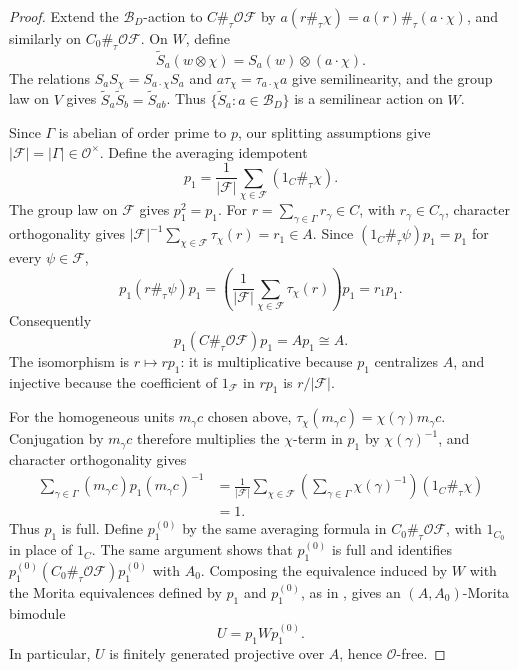 \documentclass[11pt,a4paper]{article}
\theoremstyle{definition}
\theoremstyle{remark}
\numberwithin{equation}{section}
\newcommand{\cO}{\mathcal{O}}
\begin{document}
\begin{proof}
		Extend the $\mathcal B_D$-action to $C\#_\tau\cO\mathcal F$ by
		$a(r\#_\tau\chi)=a(r)\#_\tau(a\cdot\chi)$, and similarly on
		$C_0\#_\tau\cO\mathcal F$. On $W$, define
		\[
		\widetilde S_a(w\otimes\chi)=S_a(w)\otimes(a\cdot\chi).
		\]
		The relations $S_aS_\chi=S_{a\cdot\chi}S_a$ and
		$a\tau_\chi=\tau_{a\cdot\chi}a$ give semilinearity, and the group
		law on $V$ gives
		$\widetilde S_a\widetilde S_b=\widetilde S_{ab}$.
		Thus $\{\widetilde S_a:a\in\mathcal B_D\}$ is a semilinear
		action on $W$.
		
		Since $\Gamma$ is abelian of order prime to $p$, our splitting
		assumptions give $|\mathcal F|=|\Gamma|\in\cO^\times$.
		Define the averaging idempotent
		\[
		p_1=\frac1{|\mathcal F|}\sum_{\chi\in\mathcal F}
		(1_C\#_\tau\chi).
		\]
		The group law on $\mathcal F$ gives $p_1^2=p_1$.
		For $r=\sum_{\gamma\in\Gamma}r_\gamma\in C$, with
		$r_\gamma\in C_\gamma$, character orthogonality gives
		$|\mathcal F|^{-1}\sum_{\chi\in\mathcal F}\tau_\chi(r)=r_1\in A$.
		Since $(1_C\#_\tau\psi)p_1=p_1$ for every $\psi\in\mathcal F$,
		\[
		p_1(r\#_\tau\psi)p_1
		=\left(\frac1{|\mathcal F|}
		\sum_{\chi\in\mathcal F}\tau_\chi(r)\right)p_1=r_1p_1.
		\]
		Consequently
		\begin{equation}\label{eq:local-full-corners}
			p_1(C\#_\tau\cO\mathcal F)p_1=Ap_1\cong A.
		\end{equation}
		The isomorphism is $r\mapsto rp_1$: it is multiplicative because
		$p_1$ centralizes $A$, and injective because the coefficient of
		$1_{\mathcal F}$ in $rp_1$ is $r/|\mathcal F|$.
		
		For the homogeneous units $m_\gamma c$ chosen above,
		$\tau_\chi(m_\gamma c)=\chi(\gamma)m_\gamma c$.
		Conjugation by $m_\gamma c$ therefore multiplies the $\chi$-term
		in $p_1$ by $\chi(\gamma)^{-1}$, and character orthogonality gives
		\[
		\begin{aligned}
			\sum_{\gamma\in\Gamma}(m_\gamma c)p_1(m_\gamma c)^{-1}
			&=\frac1{|\mathcal F|}\sum_{\chi\in\mathcal F}
			\left(\sum_{\gamma\in\Gamma}\chi(\gamma)^{-1}\right)
			(1_C\#_\tau\chi)\\
			&=1.
		\end{aligned}
		\]
		Thus $p_1$ is full.
		Define $p_1^{(0)}$ by the same averaging formula in
		$C_0\#_\tau\cO\mathcal F$, with $1_{C_0}$ in place of $1_C$.
		The same argument shows that $p_1^{(0)}$ is full and identifies
		$p_1^{(0)}(C_0\#_\tau\cO\mathcal F)p_1^{(0)}$ with $A_0$.
		Composing the equivalence induced by $W$ with the Morita
		equivalences defined by $p_1$ and $p_1^{(0)}$, as in
		\cite[Theorem~2.8.7 and Corollary~2.8.10]{Linckelmann2018a}, gives an
		$(A,A_0)$-Morita bimodule
		\[
		U=p_1Wp_1^{(0)}.
		\]
		In particular, $U$ is finitely generated projective over $A$,
		hence $\cO$-free.
		

\end{proof}
\end{document}
